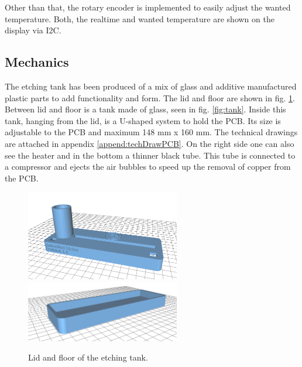 Other than that, the rotary encoder is implemented to easily adjust the wanted temperature. Both, the realtime and wanted temperature are shown on the display via I2C.

\subsection{Mechanics}
\label{subsec:etching_tank_mechanics}

The etching tank has been produced of a mix of glass and additive manufactured plastic parts to add functionality and form.
The lid and floor are shown in fig. \ref{fig:lidFloor}. Between lid and floor is a tank made of glass, seen in fig. \ref{fig:tank}. Inside this tank, hanging from the lid, is a U-shaped system to hold the PCB. Its size is adjustable to the PCB and maximum 148 mm x 160 mm. The technical drawings are attached in appendix \ref{append:techDrawPCB}. On the right side one can also see the heater and in the bottom a thinner black tube. This tube is connected to a compressor and ejects the air bubbles to speed up the removal of copper from the PCB.

\begin{figure}[H]
\centering          
\includegraphics[width=0.6\textwidth]{./fig/lid}   
\includegraphics[width=0.6\textwidth]{./fig/floor} 
\caption[Lid and floor of the etching tank.]{Lid and floor of the etching tank.}   
\label{fig:lidFloor} 
\end{figure}


